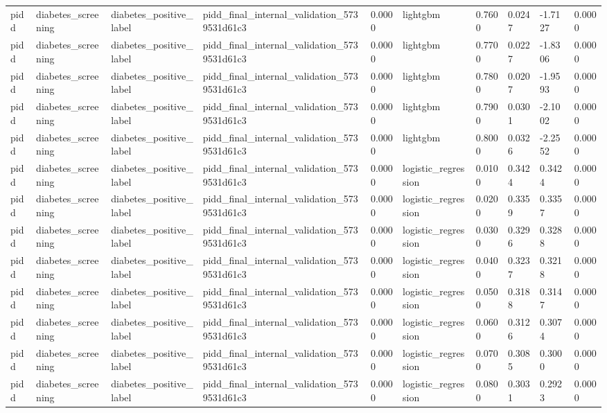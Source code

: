 \begin{tabular}{llllllllll}
pidd & diabetes\_screening & diabetes\_positive\_label & pidd\_final\_internal\_validation\_5739531d61c3 & 0.0000 & lightgbm & 0.7600 & 0.0247 & -1.7127 & 0.0000 \\
pidd & diabetes\_screening & diabetes\_positive\_label & pidd\_final\_internal\_validation\_5739531d61c3 & 0.0000 & lightgbm & 0.7700 & 0.0227 & -1.8306 & 0.0000 \\
pidd & diabetes\_screening & diabetes\_positive\_label & pidd\_final\_internal\_validation\_5739531d61c3 & 0.0000 & lightgbm & 0.7800 & 0.0207 & -1.9593 & 0.0000 \\
pidd & diabetes\_screening & diabetes\_positive\_label & pidd\_final\_internal\_validation\_5739531d61c3 & 0.0000 & lightgbm & 0.7900 & 0.0301 & -2.1002 & 0.0000 \\
pidd & diabetes\_screening & diabetes\_positive\_label & pidd\_final\_internal\_validation\_5739531d61c3 & 0.0000 & lightgbm & 0.8000 & 0.0326 & -2.2552 & 0.0000 \\
pidd & diabetes\_screening & diabetes\_positive\_label & pidd\_final\_internal\_validation\_5739531d61c3 & 0.0000 & logistic\_regression & 0.0100 & 0.3424 & 0.3424 & 0.0000 \\
pidd & diabetes\_screening & diabetes\_positive\_label & pidd\_final\_internal\_validation\_5739531d61c3 & 0.0000 & logistic\_regression & 0.0200 & 0.3359 & 0.3357 & 0.0000 \\
pidd & diabetes\_screening & diabetes\_positive\_label & pidd\_final\_internal\_validation\_5739531d61c3 & 0.0000 & logistic\_regression & 0.0300 & 0.3296 & 0.3288 & 0.0000 \\
pidd & diabetes\_screening & diabetes\_positive\_label & pidd\_final\_internal\_validation\_5739531d61c3 & 0.0000 & logistic\_regression & 0.0400 & 0.3237 & 0.3218 & 0.0000 \\
pidd & diabetes\_screening & diabetes\_positive\_label & pidd\_final\_internal\_validation\_5739531d61c3 & 0.0000 & logistic\_regression & 0.0500 & 0.3188 & 0.3147 & 0.0000 \\
pidd & diabetes\_screening & diabetes\_positive\_label & pidd\_final\_internal\_validation\_5739531d61c3 & 0.0000 & logistic\_regression & 0.0600 & 0.3126 & 0.3074 & 0.0000 \\
pidd & diabetes\_screening & diabetes\_positive\_label & pidd\_final\_internal\_validation\_5739531d61c3 & 0.0000 & logistic\_regression & 0.0700 & 0.3085 & 0.3000 & 0.0000 \\
pidd & diabetes\_screening & diabetes\_positive\_label & pidd\_final\_internal\_validation\_5739531d61c3 & 0.0000 & logistic\_regression & 0.0800 & 0.3031 & 0.2923 & 0.0000 \\

\end{tabular}
